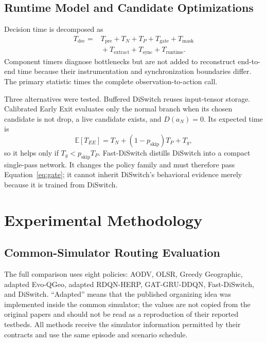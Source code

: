 \documentclass{ieeeaccess}
\newcommand{\DS}{DiSwitch}
\newcommand{\FastDS}{Fast-DiSwitch}
\newcommand{\E}{\mathbb{E}}
\begin{document}
\subsection{Runtime Model and Candidate Optimizations}

Decision time is decomposed as
\begin{equation}
\begin{aligned}
T_{\mathrm{dec}}={}&T_{\mathrm{pre}}+T_N+T_P+T_{\mathrm{gate}}+T_{\mathrm{mask}}\\
&{}+T_{\mathrm{extract}}+T_{\mathrm{sync}}+T_{\mathrm{runtime}}.
\end{aligned}
\end{equation}
Component timers diagnose bottlenecks but are not added to reconstruct end-to-end time because their instrumentation and synchronization boundaries differ. The primary statistic times the complete observation-to-action call.

Three alternatives were tested. Buffered DiSwitch reuses input-tensor storage. Calibrated Early Exit evaluates only the normal branch when its chosen candidate is not drop, a live candidate exists, and $D(a_N)=0$. Its expected time is
\begin{equation}
\E[T_{EE}]=T_N+(1-p_{\mathrm{skip}})T_P+T_g,
\end{equation}
so it helps only if $T_g<p_{\mathrm{skip}}T_P$. \FastDS{} distills \DS{} into a compact single-pass network. It changes the policy family and must therefore pass Equation~\eqref{eq:gate}; it cannot inherit \DS{}'s behavioral evidence merely because it is trained from \DS{}.

\section{Experimental Methodology}

\subsection{Common-Simulator Routing Evaluation}

The full comparison uses eight policies: AODV, OLSR, Greedy Geographic, adapted Evo-QGeo, adapted RDQN-HERP, GAT-GRU-DDQN, \FastDS{}, and \DS{}. ``Adapted'' means that the published organizing idea was implemented inside the common simulator; the values are not copied from the original papers and should not be read as a reproduction of their reported testbeds. All methods receive the simulator information permitted by their contracts and use the same episode and scenario schedule.
\end{document}
